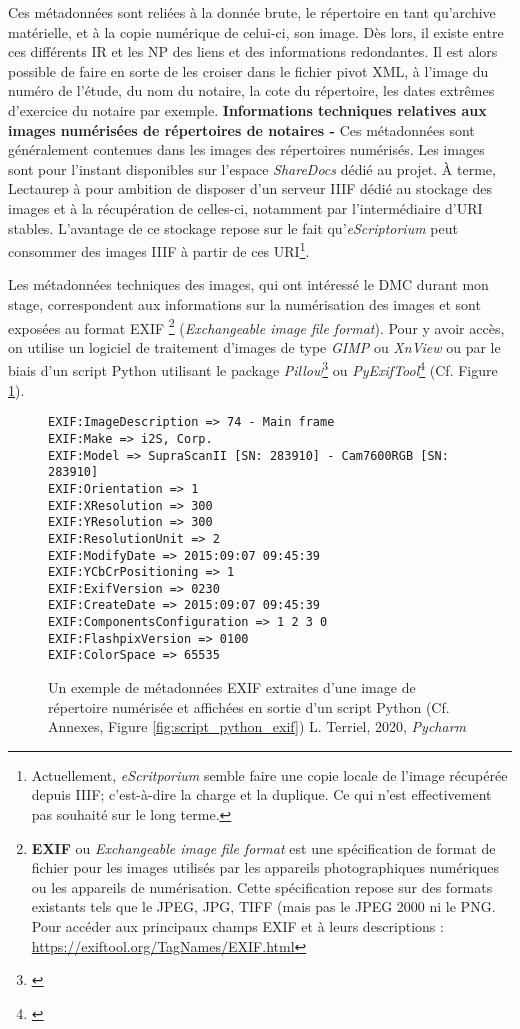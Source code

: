 Ces  métadonnées sont reliées à la donnée brute, le répertoire en tant qu'archive matérielle, et à la copie numérique de celui-ci, son image. Dès lors, il existe entre ces différents IR et les NP des liens et des informations redondantes. Il est alors possible de faire en sorte de les croiser dans le fichier pivot XML, à l'image du numéro de l'étude, du nom du notaire, la cote du répertoire, les dates extrêmes d'exercice du notaire par exemple.
\newpage
\textbf{Informations techniques relatives aux images numérisées de répertoires de notaires -} Ces métadonnées sont généralement contenues dans les images des répertoires numérisés. Les images sont pour l'instant disponibles sur l'espace \textit{ShareDocs} dédié au projet. À terme, Lectaurep à pour ambition de disposer d'un serveur IIIF dédié au stockage des images et à la récupération de celles-ci, notamment par l'intermédiaire d'URI stables. L'avantage de ce stockage repose sur le fait qu'\textit{eScriptorium} peut consommer des images IIIF à partir de ces URI\footnote{Actuellement, \textit{eScritporium} semble faire une copie locale de l'image récupérée depuis IIIF; c'est-à-dire la charge et la duplique. Ce qui n'est effectivement pas souhaité sur le long terme.}.

Les métadonnées techniques des images, qui ont intéressé le DMC durant mon stage, correspondent aux informations sur la numérisation des images et sont exposées au format EXIF \footnote{\textbf{EXIF} ou \textit{Exchangeable image file format} est une spécification de format de fichier pour les images utilisés par les appareils photographiques numériques ou les appareils de numérisation. Cette spécification repose sur des formats existants tels que le JPEG, JPG, TIFF (mais pas le JPEG 2000 ni le PNG. Pour accéder aux principaux champs EXIF et à leurs descriptions : \url{https://exiftool.org/TagNames/EXIF.html}} (\textit{Exchangeable image file format}). Pour y avoir accès, on utilise un logiciel de traitement d'images de type \textit{GIMP} ou \textit{XnView} ou par le biais d'un script Python utilisant le package \textit{Pillow}\footnote{\cite{noauthor_pillow_nodate}} ou \textit{PyExifTool}\footnote{\cite{noauthor_pyexiftool_nodate}} (Cf. Figure \ref{fig:sortie_exif_metadata}). 

\begin{figure}[h]
\lstset{language=Python}
\begin{lstlisting}
EXIF:ImageDescription => 74 - Main frame
EXIF:Make => i2S, Corp.
EXIF:Model => SupraScanII [SN: 283910] - Cam7600RGB [SN: 283910]
EXIF:Orientation => 1
EXIF:XResolution => 300
EXIF:YResolution => 300
EXIF:ResolutionUnit => 2
EXIF:ModifyDate => 2015:09:07 09:45:39
EXIF:YCbCrPositioning => 1
EXIF:ExifVersion => 0230
EXIF:CreateDate => 2015:09:07 09:45:39
EXIF:ComponentsConfiguration => 1 2 3 0
EXIF:FlashpixVersion => 0100
EXIF:ColorSpace => 65535
\end{lstlisting}
\caption{Un exemple de métadonnées EXIF extraites d'une image de répertoire numérisée et affichées en sortie d'un script Python (Cf. Annexes, Figure \ref{fig:script_python_exif})  \textcopyright L. Terriel, 2020, \textit{Pycharm}}
\label{fig:sortie_exif_metadata}
\end{figure}

